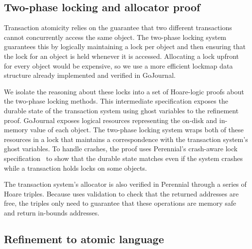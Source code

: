 
\subsection{Two-phase locking and allocator proof}

Transaction atomicity relies on the guarantee that two different transactions
cannot concurrently access the same object. The two-phase locking system
guarantees this by logically maintaining a lock per object and then ensuring
that the lock for an object is held whenever it is accessed. Allocating a lock
upfront for every object would be expensive, so we use a more efficient lockmap
data structure already implemented and verified in GoJournal.

We isolate the reasoning about these locks into a set of Hoare-logic proofs
about the two-phase locking methods. This intermediate specification exposes the
durable state of the transaction system using ghost variables to the refinement
proof.  GoJournal exposes logical resources representing the on-disk and
in-memory value of each object. The two-phase locking system wraps both of these
resources in a lock that maintains a correspondence with the transaction
system's ghost variables. To handle crashes, the proof uses Perennial's
crash-aware lock specification~\citep{chajed:gojournal} to show that the durable
state matches even if the system crashes while a transaction holds locks on some
objects.


The transaction system's allocator is also verified in Perennial through a
series of Hoare triples.  Because \sys uses validation to check that the
returned addresses are free, the triples only need to guarantee that these
operations are memory safe and return in-bounds addresses.

\subsection{Refinement to atomic language}


